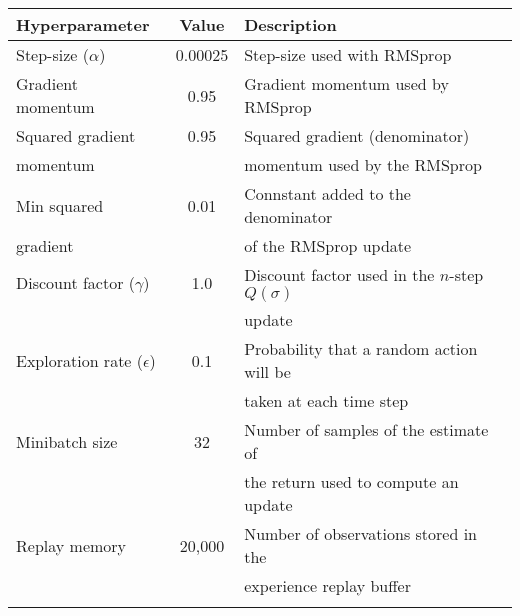 \begin{table}[t]
    \centering
    \begin{tabular}{l|c|l}
         Hyperparameter                 & Value     & Description  \\ \bottomrule
         Step-size ($\alpha$)           & 0.00025   & Step-size used with RMSprop 
         \\ \hdashline[3pt/3pt]
         Gradient momentum              & 0.95      & Gradient momentum used by RMSprop
         \\ \hdashline[3pt/3pt]
         Squared gradient               & 0.95      & Squared gradient (denominator)  \\
         momentum                       &           &  momentum used by the RMSprop  
         \\ \hdashline[3pt/3pt]
         Min squared                    & 0.01      & Connstant added to the denominator \\
         gradient                       &           & of the RMSprop update 
         \\ \hdashline[3pt/3pt]
         Discount factor ($\gamma$)     & 1.0       & Discount factor used in the $n$-step $Q(\sigma)$ \\
                                        &           & update
        \\ \hdashline[3pt/3pt]
        Exploration rate ($\epsilon$)   & 0.1       & Probability that a random action will be \\
                                        &           & taken at each time step
        \\ \hdashline[3pt/3pt]
        Minibatch size                  & 32        & Number of samples of the estimate of  \\
                                        &           & the return used to compute an update
        \\ \hdashline[3pt/3pt]
        Replay memory                   & 20,000    & Number of observations stored in the \\
                                        &           & experience replay buffer
        \\ \hdashline[3pt/3pt]

\end{tabular}
\end{table}
